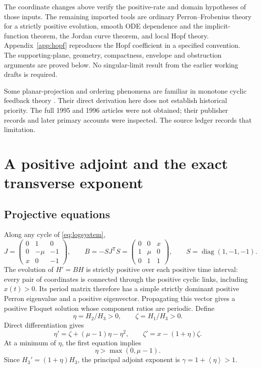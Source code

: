 \documentclass[11pt,a4paper]{article}
\numberwithin{equation}{section}
\theoremstyle{remark}\newtheorem{remark}[theorem]{Remark}
\newcommand{\avg}[1]{\left\langle #1\right\rangle}
\DeclareMathOperator{\diag}{diag}
\begin{document}
The coordinate changes above verify the positive-rate and domain hypotheses of those inputs. The remaining imported tools are ordinary Perron--Frobenius theory for a strictly positive evolution, smooth ODE dependence and the implicit-function theorem, the Jordan curve theorem, and local Hopf theory. Appendix~\ref{app:hopf} reproduces the Hopf coefficient in a specified convention. The supporting-plane, geometry, compactness, envelope and obstruction arguments are proved below. No singular-limit result from the earlier working drafts is required.

Some planar-projection and ordering phenomena are familiar in monotone cyclic feedback theory \cite{MPS90}. Their direct derivation here does not establish historical priority. The full 1995 and 1996 articles were not obtained; their publisher records and later primary accounts were inspected. The source ledger records that limitation.

\section{A positive adjoint and the exact transverse exponent}\label{sec:adjoint}
\subsection{Projective equations}
Along any cycle of \eqref{eq:logsystem},
\begin{equation}\label{eq:adjointmatrices}
J=\begin{pmatrix}0&1&0\\0&-\mu&-1\\x&0&-1\end{pmatrix},\qquad
B=-SJ^{\mathsf T}S=\begin{pmatrix}0&0&x\\1&\mu&0\\0&1&1\end{pmatrix},\qquad
S=\diag(1,-1,-1).
\end{equation}
The evolution of $H'=BH$ is strictly positive over each positive time interval: every pair of coordinates is connected through the positive cyclic links, including $x(t)>0$. Its period matrix therefore has a simple strictly dominant positive Perron eigenvalue and a positive eigenvector. Propagating this vector gives a positive Floquet solution whose component ratios are periodic. Define
\begin{equation}\label{eq:ratios}
\eta=H_2/H_3>0,\qquad \zeta=H_1/H_3>0.
\end{equation}
Direct differentiation gives
\begin{equation}\label{eq:projective}
\eta'=\zeta+(\mu-1)\eta-\eta^2,\qquad
\zeta'=x-(1+\eta)\zeta.
\end{equation}
At a minimum of $\eta$, the first equation implies
\begin{equation}\label{eq:etaminbasic}
\eta>\max(0,\mu-1).
\end{equation}
Since $H_3'=(1+\eta)H_3$, the principal adjoint exponent is $\gamma=1+\avg\eta>1$.
\end{document}
